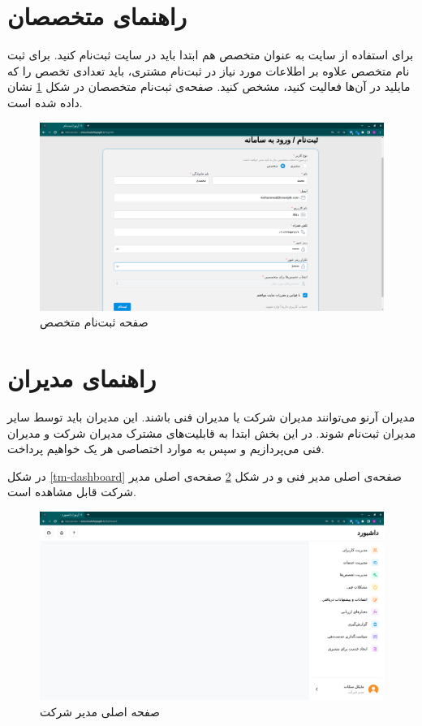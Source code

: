 \FloatBarrier
\section{راهنمای متخصصان}

برای استفاده از سایت به عنوان متخصص هم ابتدا باید در سایت ثبت‌نام کنید.
برای ثبت نام متخصص علاوه بر اطلاعات مورد نیاز در ثبت‌نام مشتری، باید تعدادی تخصص را که مایلید در آن‌ها فعالیت کنید، مشخص کنید.
صفحه‌ی ثبت‌نام متخصصان در شکل \ref{specialist-signup} نشان داده شده است.

\begin{figure}[h]
	\centering
	\includegraphics[width=\textwidth]{figs/user-guide/specialist-signup}
	\caption{صفحه ثبت‌نام متخصص}
	\label{specialist-signup}
\end{figure}

\FloatBarrier
\section{راهنمای مدیران}

مدیران آرنو می‌توانند مدیران شرکت یا مدیران فنی باشند.
این مدیران باید توسط سایر مدیران ثبت‌نام شوند. 
در این بخش ابتدا به قابلیت‌های مشترک مدیران شرکت و مدیران فنی می‌پردازیم و سپس به موارد اختصاصی هر یک خواهیم پرداخت.

در شکل \ref{tm-dashboard} صفحه‌ی اصلی مدیر فنی و در شکل \ref{cm-dashboard} صفحه‌ی اصلی مدیر شرکت قابل مشاهده است.

\begin{figure}[h]
	\centering
	\includegraphics[width=\textwidth]{figs/user-guide/cm-dashboard}
	\caption{صفحه اصلی مدیر شرکت}
	\label{cm-dashboard}
\end{figure}

